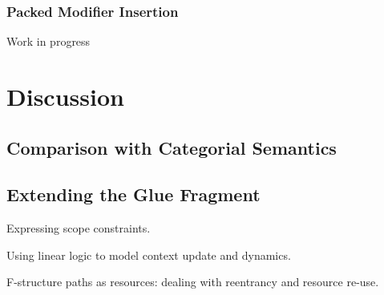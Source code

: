 \subsubsection{Packed Modifier Insertion}
Work in progress

\section{Discussion}

\subsection{Comparison with Categorial Semantics}

\subsection{Extending the Glue Fragment}

Expressing scope constraints.

Using linear logic to model context update and dynamics.

F-structure paths as resources: dealing with reentrancy and resource
re-use.
